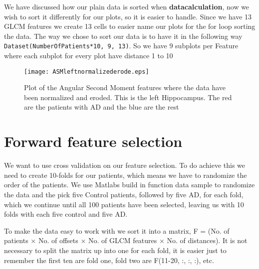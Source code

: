 We have discussed how our plain data is sorted when \textbf{datacalculation}, now we wish to sort it differently for our plots, so it is easier to handle. Since we have 13 GLCM features  we create 13 cells to easier name our plots for the for loop sorting the data. The way we chose to sort our data is to have it in the following way \texttt{Dataset(NumberOfPatients*10, 9, 13)}. So we have 9 subplots per Feature where each subplot for every plot have distance 1 to 10

\begin{figure}[H]
  \centering
  \texttt{[image: ASMleftnormalizederode.eps]}
  \caption{Plot of the Angular Second Moment features where the data have been normalized and eroded. This is the left Hippocampus. The red are the patients with AD and the blue are the rest}\label{fig:ASMNormalizedEroded}
\end{figure}



\section{Forward feature selection}

We want to use cross validation on our feature selection. To do achieve this we need to create 10-folds for our patients, which means we have to randomize the order of the patients. We use Matlabs build in function data sample to randomize the data and the pick five Control patients, followed by five AD, for each fold, which we continue until all 100 patients have been selected, leaving us with 10 folds with each five control and five AD.

To make the data easy to work with we sort it into a matrix, F = (No. of patients $\times$ No. of offsets $\times$ No. of GLCM features $\times$ No. of distances). It is not necessary to split the matrix up into one for each fold, it is easier just to remember the first ten are fold one, fold two are F(11-20, :, :, :), etc.

